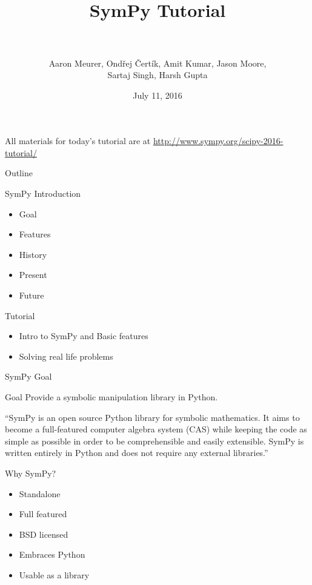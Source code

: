 \documentclass[xcolor=svgnames]{beamer}
\title[SymPy\hspace{4em}\insertframenumber/
\inserttotalframenumber]{~\\ SymPy Tutorial \\~}
\author[A. Meurer, Matthew Rocklin, Jason Moore]
{Aaron Meurer, Ondřej Čertík, Amit Kumar, Jason Moore, \\ Sartaj Singh, Harsh Gupta}
\institute{\pgfuseimage{mylogo}}
\date{July 11, 2016}
\begin{document}
\begin{frame}
  \maketitle
\begin{center}
\normalsize All materials for today's tutorial are at \url{http://www.sympy.org/scipy-2016-tutorial/}
\end{center}
\end{frame}

\begin{frame}{Outline}
  \begin{block}{SymPy Introduction}
    \begin{itemize}
    \item Goal
    \item Features
    \item History
    \item Present
    \item Future
    \end{itemize}
  \end{block}

  \begin{block}{Tutorial}
    \begin{itemize}
    \item Intro to SymPy and Basic features
    \item Solving real life problems
    \end{itemize}
  \end{block}
\end{frame}

\begin{frame}{SymPy Goal}
  \begin{block}{Goal}
    Provide a symbolic manipulation library in Python.
  \end{block}
  \pause
  \begin{block}

    ``SymPy is an open source Python library for symbolic mathematics. It aims to
    become a full-featured computer algebra system (CAS) while keeping the code as
    simple as possible in order to be comprehensible and easily extensible. SymPy
    is written entirely in Python and does not require any external libraries.''

  \end{block}
\end{frame}

\begin{frame}{Why SymPy?}
  \begin{block}{}
    \begin{itemize}
      \item Standalone
      \item Full featured
      \item BSD licensed
      \item Embraces Python
      \item Usable as a library
    \end{itemize}
  \end{block}
\end{frame}
\end{document}
